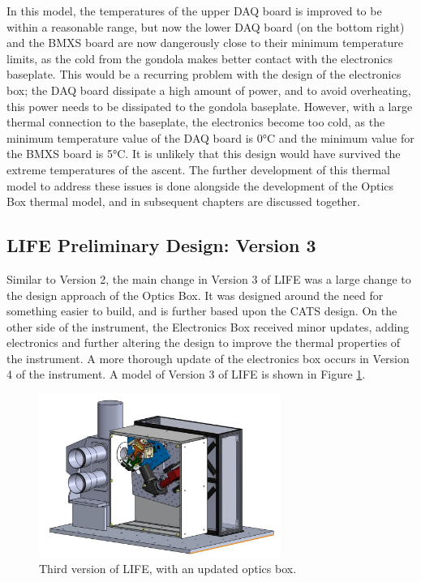 In this model, the temperatures of the upper DAQ board is improved to be within a reasonable range, but now the lower DAQ board (on the bottom right) and the BMXS board are now dangerously close to their minimum temperature limits, as the cold from the gondola makes better contact with the electronics baseplate. This would be a recurring problem with the design of the electronics box; the DAQ board dissipate a high amount of power, and to avoid overheating, this power needs to be dissipated to the gondola baseplate. However, with a large thermal connection to the baseplate, the electronics become too cold, as the minimum temperature value of the DAQ board is 0°C and the minimum value for the BMXS board is 5°C. It is unlikely that this design would have survived the extreme temperatures of the ascent. The further development of this thermal model to address these issues is done alongside the development of the Optics Box thermal model, and in subsequent chapters are discussed together. 

\subsection{LIFE Preliminary Design: Version 3}

Similar to Version 2, the main change in Version 3 of LIFE was a large change to the design approach of the Optics Box. It was designed around the need for something easier to build, and is further based upon the CATS design. On the other side of the instrument, the Electronics Box received minor updates, adding electronics and further altering the design to improve the thermal properties of the instrument. A more thorough update of the electronics box occurs in Version 4 of the instrument. A model of Version 3 of LIFE is shown in Figure \ref{fig:LIFE_V3}.

\begin{figure}
    \centering
    \includegraphics[width=0.7\textwidth]{chap3_images/LIFE_V3_images/LIFE_V3.JPG}
    \caption{Third version of LIFE, with an updated optics box.}
    \label{fig:LIFE_V3}
\end{figure}

